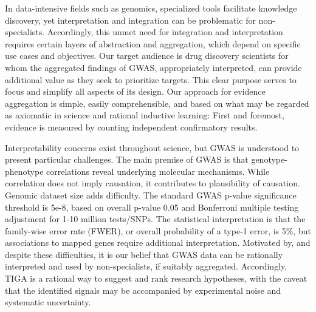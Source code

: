 In data-intensive fields such as genomics, specialized tools facilitate knowledge discovery, yet interpretation and integration can be problematic for non-specialists. Accordingly, this unmet need for integration and interpretation requires certain layers of abstraction and aggregation, which depend on specific use cases and objectives. Our target audience is drug discovery scientists for whom the aggregated findings of GWAS, appropriately interpreted, can provide additional value as they seek to prioritize targets. This clear purpose serves to focus and simplify all aspects of its design. Our approach for evidence aggregation is simple, easily comprehensible, and based on what may be regarded as axiomatic in science and rational inductive learning: First and foremost, evidence is measured by counting independent confirmatory results.

Interpretability concerns exist throughout science, but GWAS is understood to present particular challenges\cite{Lambert2012-tr,Visscher2017-jp,Marigorta2018-xk,Gallagher2018-ev}. The main premise of GWAS is that genotype-phenotype correlations reveal underlying molecular mechanisms. While correlation does not imply causation, it contributes to plausibility of causation.  Genomic dataset size adds difficulty.  The standard GWAS p-value significance threshold is 5e-8, based on overall p-value 0.05 and Bonferroni multiple testing adjustment for 1-10 million tests/SNPs\cite{Marigorta2018-xk}. The statistical interpretation is that the family-wise error rate (FWER), or overall probability of a type-1 error, is 5\%, but associations to mapped genes require additional interpretation. Motivated by, and despite these difficulties, it is our belief that GWAS data can be rationally interpreted and used by non-specialists, if suitably aggregated. Accordingly, TIGA is a rational way to suggest and rank research hypotheses, with the caveat that the identified signals may be accompanied by experimental noise and systematic uncertainty.

